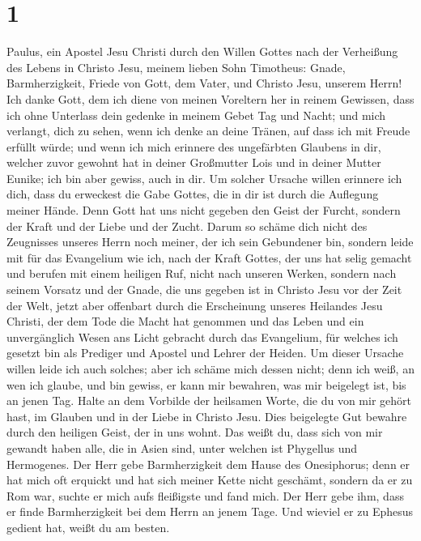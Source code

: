 \hypertarget{section}{%
\section{1}\label{section}}

 Paulus, ein Apostel Jesu Christi durch den Willen Gottes
nach der Verheißung des Lebens in Christo Jesu,  meinem
lieben Sohn Timotheus: Gnade, Barmherzigkeit, Friede von Gott, dem
Vater, und Christo Jesu, unserem Herrn!  Ich danke Gott,
dem ich diene von meinen Voreltern her in reinem Gewissen, dass ich ohne
Unterlass dein gedenke in meinem Gebet Tag und Nacht;  und
mich verlangt, dich zu sehen, wenn ich denke an deine Tränen, auf dass
ich mit Freude erfüllt würde;  und wenn ich mich erinnere
des ungefärbten Glaubens in dir, welcher zuvor gewohnt hat in deiner
Großmutter Lois und in deiner Mutter Eunike; ich bin aber gewiss, auch
in dir.  Um solcher Ursache willen erinnere ich dich, dass
du erweckest die Gabe Gottes, die in dir ist durch die Auflegung meiner
Hände.  Denn Gott hat uns nicht gegeben den Geist der
Furcht, sondern der Kraft und der Liebe und der Zucht. 
Darum so schäme dich nicht des Zeugnisses unseres Herrn noch meiner, der
ich sein Gebundener bin, sondern leide mit für das Evangelium wie ich,
nach der Kraft Gottes,  der uns hat selig gemacht und
berufen mit einem heiligen Ruf, nicht nach unseren Werken, sondern nach
seinem Vorsatz und der Gnade, die uns gegeben ist in Christo Jesu vor
der Zeit der Welt,  jetzt aber offenbart durch die
Erscheinung unseres Heilandes Jesu Christi, der dem Tode die Macht hat
genommen und das Leben und ein unvergänglich Wesen ans Licht gebracht
durch das Evangelium,  für welches ich gesetzt bin als
Prediger und Apostel und Lehrer der Heiden.  Um dieser
Ursache willen leide ich auch solches; aber ich schäme mich dessen
nicht; denn ich weiß, an wen ich glaube, und bin gewiss, er kann mir
bewahren, was mir beigelegt ist, bis an jenen Tag.  Halte
an dem Vorbilde der heilsamen Worte, die du von mir gehört hast, im
Glauben und in der Liebe in Christo Jesu.  Dies
beigelegte Gut bewahre durch den heiligen Geist, der in uns wohnt.
 Das weißt du, dass sich von mir gewandt haben alle, die
in Asien sind, unter welchen ist Phygellus und Hermogenes.
 Der Herr gebe Barmherzigkeit dem Hause des Onesiphorus;
denn er hat mich oft erquickt und hat sich meiner Kette nicht geschämt,
 sondern da er zu Rom war, suchte er mich aufs fleißigste
und fand mich.  Der Herr gebe ihm, dass er finde
Barmherzigkeit bei dem Herrn an jenem Tage. Und wieviel er zu Ephesus
gedient hat, weißt du am besten.

